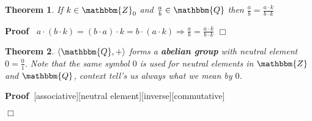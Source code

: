 \documentclass{book}
\newcommand{\tmtextbf}[1]{{\bfseries{#1}}}
\newcommand{\upl}{+}
\newenvironment{proof}{\noindent\textbf{Proof\ }}{\hspace*{\fill}$\Box$\medskip}
\newtheorem{theorem}{Theorem}
\begin{document}
{{\begin{theorem}
  \label{a/b=a.k/b.k if k<less><gtr>0}If $k \in \mathbbm{Z}_0$ and
  $\frac{a}{b} \in \mathbbm{Q}$ then $\frac{a}{b} = \frac{a \cdot k}{b \cdot
  k}$
\end{theorem}

\begin{proof}
  $a \cdot (b \cdot k) = (b \cdot a) \cdot k = b \cdot (a \cdot k) \Rightarrow
  \frac{a}{b} = \frac{a \cdot k}{b \cdot k}$
\end{proof}

\begin{theorem}
  \label{the set of rational numbers forms a abelian group for
  addition}{\index{$\langle \mathbbm{Q}, \upl \rangle$}}$\langle \mathbbm{Q},
  + \rangle$ forms a \tmtextbf{abelian group} with neutral element $0 =
  \frac{0}{1}$. Note that the same symbol $0$ is used for neutral elements in
  $\mathbbm{Z}$ and $\mathbbm{Q}$, context tell's us always what we mean by
  $0$. 
\end{theorem}

\begin{proof}[associative][neutral element][inverse][commutative]
  

\end{proof}}}
\end{document}
